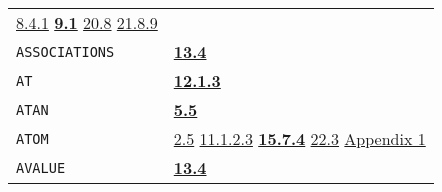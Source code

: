 \documentclass[a4paper,]{article}
\begin{document}
\begin{longtable}[]{@{}ll@{}}
\begin{minipage}[t]{0.70\columnwidth}
\href{08-truth.md\#841-and-and-or-as-short-conds}{8.4.1} \textbf{\href{09-functions.md\#91-optional-1}{9.1}}
\href{20-coroutines.md\#208-sneakiness-with-processes}{20.8} \href{21-interrupts.md\#2189-read-and-write}{21.8.9}\strut
\end{minipage}\tabularnewline
\begin{minipage}[t]{0.24\columnwidth}\raggedright\strut
\texttt{ASSOCIATIONS}\strut
\end{minipage} & \begin{minipage}[t]{0.70\columnwidth}\raggedright\strut
\textbf{\href{13-association-properties.md\#134-examining-associations}{13.4}}\strut
\end{minipage}\tabularnewline
\begin{minipage}[t]{0.24\columnwidth}\raggedright\strut
\texttt{AT}\strut
\end{minipage} & \begin{minipage}[t]{0.70\columnwidth}\raggedright\strut
\textbf{\href{12-locatives.md\#1213-at}{12.1.3}}\strut
\end{minipage}\tabularnewline
\begin{minipage}[t]{0.24\columnwidth}\raggedright\strut
\texttt{ATAN}\strut
\end{minipage} & \begin{minipage}[t]{0.70\columnwidth}\raggedright\strut
\textbf{\href{05-simple-functions.md\#55-examples-comments-1}{5.5}}\strut
\end{minipage}\tabularnewline
\begin{minipage}[t]{0.24\columnwidth}\raggedright\strut
\texttt{ATOM}\strut
\end{minipage} & \begin{minipage}[t]{0.70\columnwidth}\raggedright\strut
\href{02-read-evaluate-print.md\#25-example-type-atom-pname-1}{2.5} \href{11-input-output.md\#11123-princ}{11.1.2.3}
\textbf{\href{15-lexical-blocking.md\#1574-atom}{15.7.4}} \href{22-storage-management.md\#223-other-storage}{22.3}
\href{appendix-1-a-look-inside.md\#basic-data-structures}{Appendix 1}\strut
\end{minipage}\tabularnewline
\begin{minipage}[t]{0.24\columnwidth}\raggedright\strut
\texttt{AVALUE}\strut
\end{minipage} & \begin{minipage}[t]{0.70\columnwidth}\raggedright\strut
\textbf{\href{13-association-properties.md\#134-examining-associations}{13.4}}\strut
\end{minipage}\tabularnewline

\end{longtable}
\end{document}
